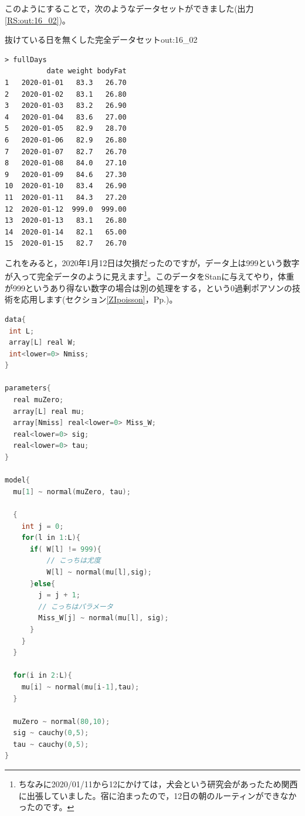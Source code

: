 \documentclass{ltjsbook}
\begin{document}
このようにすることで，次のようなデータセットができました(出力\ref{RS:out:16_02})。
\begin{Rscreen}{抜けている日を無くした完全データセット}{out:16_02}
	\begin{verbatim}
> fullDays
          date weight bodyFat
1   2020-01-01   83.3   26.70
2   2020-01-02   83.1   26.80
3   2020-01-03   83.2   26.90
4   2020-01-04   83.6   27.00
5   2020-01-05   82.9   28.70
6   2020-01-06   82.9   26.80
7   2020-01-07   82.7   26.70
8   2020-01-08   84.0   27.10
9   2020-01-09   84.6   27.30
10  2020-01-10   83.4   26.90
11  2020-01-11   84.3   27.20
12  2020-01-12  999.0  999.00
13  2020-01-13   83.1   26.80
14  2020-01-14   82.1   65.00
15  2020-01-15   82.7   26.70\end{verbatim}
\end{Rscreen}
これをみると，2020年1月12日は欠損だったのですが，データ上は999という数字が入って完全データのように見えます\footnote{ちなみに2020/01/11から12にかけては，犬会という研究会があったため関西に出張していました。宿に泊まったので，12日の朝のルーティンができなかったのです。}。このデータをStanに与えてやり，体重が999というあり得ない数字の場合は別の処理をする，という0過剰ポアソンの技術を応用します(セクション\ref{ZIpoisson}，Pp.\pageref{ZIpoisson})。
\begin{lstlisting}[language=c++,label={stan:16_05},caption={欠測値補間のコード}]
data{
 int L;
 array[L] real W;
 int<lower=0> Nmiss;
}

parameters{
  real muZero;
  array[L] real mu;
  array[Nmiss] real<lower=0> Miss_W;
  real<lower=0> sig;
  real<lower=0> tau;
}

model{
  mu[1] ~ normal(muZero, tau);
  
  {
    int j = 0;
    for(l in 1:L){
      if( W[l] != 999){
          // こっちは尤度
          W[l] ~ normal(mu[l],sig);
      }else{
        j = j + 1;
        // こっちはパラメータ
        Miss_W[j] ~ normal(mu[l], sig);
      }
    }
  }
  
  for(i in 2:L){
    mu[i] ~ normal(mu[i-1],tau);
  }
  
  muZero ~ normal(80,10); 
  sig ~ cauchy(0,5);
  tau ~ cauchy(0,5);
}
\end{lstlisting}
\end{document}
